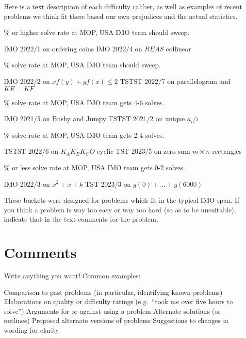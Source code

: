Here is a text description of each difficulty caliber,
as well as examples of recent problems we think fit there
based our own prejudices and the actual statistics.
\begin{description}
  \% or higher solve rate at MOP,
  USA IMO team should sweep.
  \begin{itemize}
    \ii IMO 2022/1 on ordering coins
    \ii IMO 2022/4 on $REAS$ collinear
  \end{itemize}
  \% solve rate at MOP,
  USA IMO team should sweep.
  \begin{itemize}
    \ii IMO 2022/2 on $xf(y)+yf(x)\leq 2$
    \ii TSTST 2022/7 on parallelogram and $KE=KF$
  \end{itemize}
  \% solve rate at MOP,
  USA IMO team gets 4-6 solves.
  \begin{itemize}
    \ii IMO 2021/5 on Bushy and Jumpy
    \ii TSTST 2021/2 on unique $a_i/i$
  \end{itemize}
  \% solve rate at MOP,
  USA IMO team gets 2-4 solves.
  \begin{itemize}
    \ii TSTST 2022/6 on $K_AK_BK_CO$ cyclic
    \ii TST 2023/5 on zero-sum $m\times n$ rectangles
  \end{itemize}
  \% or less solve rate at MOP,
  USA IMO team gets 0-2 solves.
  \begin{itemize}
    \ii IMO 2022/3 on $x^2+x+k$
    \ii TST 2023/3 on $g(0)+\dots+g(6000)$
  \end{itemize}
\end{description}
These buckets were designed for problems
which fit in the typical IMO span.
If you think a problem is way too easy or way too hard
(so as to be unsuitable),
indicate that in the text comments for the problem.

\section{Comments}
Write anything you want! Common examples:
\begin{itemize}
  \ii Comparison to past problems
  (in particular, identifying known problems)
  \ii Elaborations on quality or difficulty ratings
  (e.g.\ ``took me over five hours to solve'')
  \ii Arguments for or against using a problem
  \ii Alternate solutions (or outlines)
  \ii Proposed alternate versions of problems
  \ii Suggestions to changes in wording for clarity
\end{itemize}


